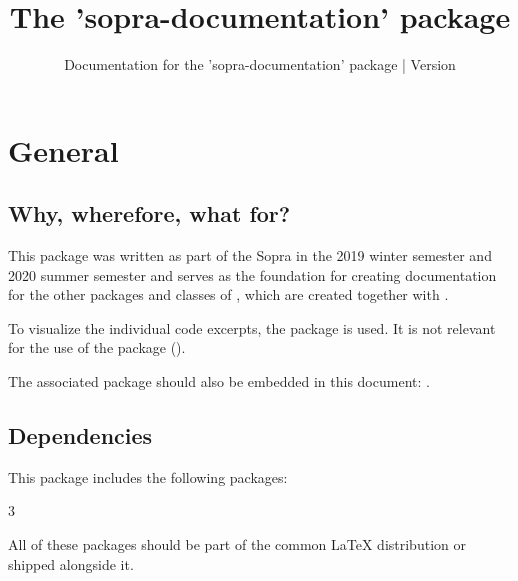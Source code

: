 \documentclass{sopra-base}
\title{The 'sopra-documentation' package}
\subtitle[Documentation for the 'sopra-documentation' package]{Documentation for the 'sopra-documentation' package | Version \thesodversion}
\begin{document}
    \maketitle%
%
%

\section{General}
\subsection{Why, wherefore, what for?}
    This \LaTeXe package was written as part of the Sopra in the
    2019 winter semester and 2020 summer semester and serves as the
    foundation for creating documentation for the other packages and classes
    of , which are created together with
    .\par
    To visualize the individual code excerpts, the
     package is used. It is not relevant for the use of the package ().\par
    The associated package should also be embedded in this document: .
\subsection{Dependencies}
    This package includes the following packages:
    \begin{multicols}{3}
    \end{multicols}
    All of these packages should be part of the common \LaTeX{} distribution or shipped alongside it.
\end{document}
